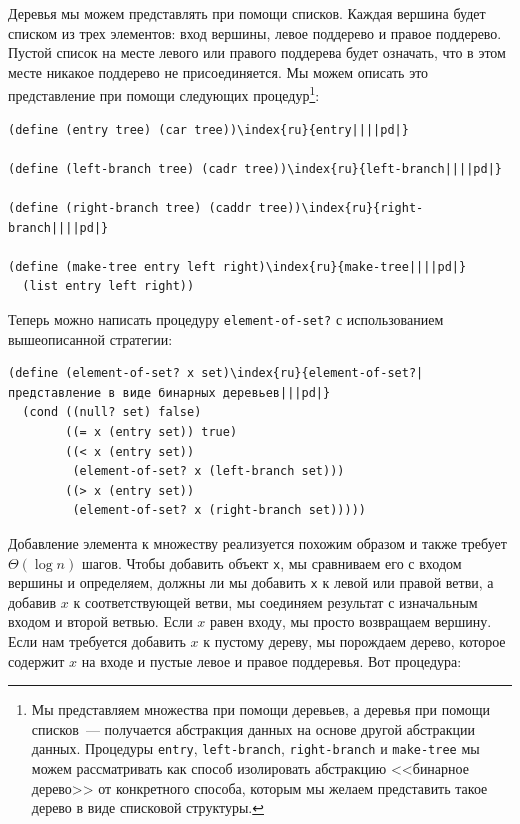  Деревья мы можем представлять при помощи
списков.  Каждая вершина будет списком из трех элементов: вход
вершины, левое поддерево и правое поддерево.  Пустой список на месте
левого или правого поддерева будет означать, что в этом месте никакое
поддерево не присоединяется.  Мы можем описать это представление при
помощи следующих процедур\footnote{Мы представляем множества при помощи деревьев, а
деревья при помощи списков~--- получается абстракция данных на основе
другой абстракции данных.  Процедуры {\tt entry},
{\tt left-branch}, {\tt right-branch} и
{\tt make-tree} мы можем рассматривать как способ изолировать
абстракцию <<бинарное дерево>> от конкретного способа, которым мы
желаем представить такое дерево в виде списковой структуры.}:

\begin{Verbatim}[fontsize=\small]
(define (entry tree) (car tree))\index{ru}{entry||||pd|}

(define (left-branch tree) (cadr tree))\index{ru}{left-branch||||pd|}

(define (right-branch tree) (caddr tree))\index{ru}{right-branch||||pd|}

(define (make-tree entry left right)\index{ru}{make-tree||||pd|}
  (list entry left right))
\end{Verbatim}

Теперь можно написать процедуру
{\tt element-of-set?} с использованием вышеописанной стратегии: 

\begin{Verbatim}[fontsize=\small]
(define (element-of-set? x set)\index{ru}{element-of-set?|представление в виде бинарных деревьев|||pd|}
  (cond ((null? set) false)
        ((= x (entry set)) true)
        ((< x (entry set))
         (element-of-set? x (left-branch set)))
        ((> x (entry set))
         (element-of-set? x (right-branch set)))))
\end{Verbatim}

Добавление элемента к множеству реализуется похожим
образом и также требует $\Theta (\log n)$ шагов.  Чтобы
добавить объект {\tt x}, мы сравниваем его с входом вершины
и определяем, должны ли мы добавить {\tt x} к левой или
правой ветви, а добавив $x$ к соответствующей ветви, мы
соединяем результат с изначальным входом и второй ветвью.  Если
$x$ равен входу, мы просто возвращаем вершину.  Если нам
требуется добавить $x$ к пустому дереву, мы порождаем
дерево, которое содержит $x$ на входе и пустые левое и
правое поддеревья.  Вот процедура:

